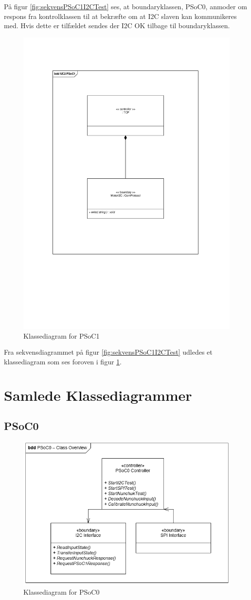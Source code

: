 På figur \ref{fig:sekvensPSoC1I2CTest} ses, at boundaryklassen, PSoC0, anmoder om respons fra kontrolklassen til at bekræfte om at I2C slaven kan kommunikeres med. Hvis dette er tilfældet sendes der I2C OK tilbage til boundaryklassen.  

\begin{figure}[H]
	\centering
	\includegraphics[width=.5\textwidth]{Systemarkitektur/images/klassediagramPSoC1}
	\caption{Klassediagram for PSoC1}
	\label{fig:klassePSoC1}
\end{figure}

Fra sekvensdiagrammet på figur \ref{fig:sekvensPSoC1I2CTest} udledes et klassediagram som ses foroven i figur \ref{fig:klassePSoC1}.

\section{Samlede Klassediagrammer}

\subsection{PSoC0}
\begin{figure}[H]
	\centering
	\includegraphics[width=\textwidth]{Systemarkitektur/images/classOverviewPSoC0}
	\caption{Klassediagram for PSoC0}
	\label{fig:OverallKlassePSoC0}
\end{figure}

